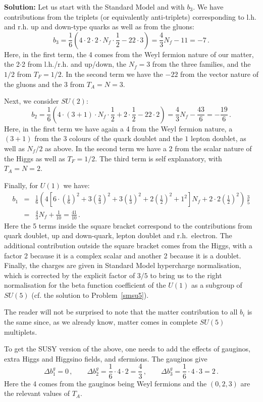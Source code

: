 \documentclass[12pt]{article}
\newcommand{\be}{\begin{equation}}
\newcommand{\ee}{\end{equation}}
\newcommand{\bea}{\begin{eqnarray}}
\newcommand{\eea}{\end{eqnarray}}
\numberwithin{equation}{section}
\begin{document}
\noindent
{\bf Solution:} Let us start with the Standard Model and with $b_3$. We have contributions from the triplets (or equivalently anti-triplets) corresponding to l.h. and r.h. up and down-type quarks as well as from the gluons:
\be
b_3=\frac{1}{6}\left(4\cdot 2\cdot 2 \cdot N_f\cdot\frac{1}{2}-22\cdot 3\right)=\frac{4}{3}N_f-11=-7\,.
\ee
Here, in the first term, the 4 comes from the Weyl fermion nature of our matter, the 2$\cdot$2 from l.h./r.h. and up/down, the $N_f=3$ from the three families, and the $1/2$ from $T_F=1/2$. In the second term we have the $-22$ from the vector nature of the gluons and the $3$ from $T_A=N=3$. 

Next, we consider $SU(2)$:
\be
b_2=\frac{1}{6}\left(4\cdot (3+1)\cdot N_f \cdot\frac{1}{2} + 2\cdot \frac{1}{2} - 22\cdot 2\right)=
\frac{4}{3}N_f-\frac{43}{6}=-\frac{19}{6}\,.
\ee
Here, in the first term we have again a 4 from the Weyl fermion nature, a $(3+1)$ from the 3 colours of the quark doublet and the $1$ lepton doublet, as well as $N_f/2$ as above. In the second term we have a 2 from the scalar nature of the Higgs as well as $T_F=1/2$. The third term is self explanatory, with $T_A=N=2$. 

Finally, for $U(1)$ we have:
\bea
b_1&=&\frac{1}{6}\left( 4\left[6\cdot\left(\frac{1}{6}\right)^2+ 3\left(\frac{2}{3}\right)^2+3\left(\frac{1}{3}\right)^2+ 2\left(\frac{1}{2}\right)^2+1^2 \right]N_f+2\cdot 2\left(\frac{1}{2}\right)^2\right)\,\frac{3}{5}
\nonumber
\\
&=&\frac{4}{3}N_f+\frac{1}{10}=\frac{41}{10}\,.
\eea
Here the 5 terms inside the square bracket correspond to the contributions from quark doublet, up and down-quark, lepton doublet and r.h.~electron. The additional contribution outside the square bracket comes from the Higgs, with a factor 2 because it is a complex scalar and another 2 because it is a doublet. Finally, the charges are given in Standard Model hypercharge normalisation, which is corrected by the explicit factor of $3/5$ to bring us to the right normalisation for the beta function coefficient of the $U(1)$ as a subgroup of $SU(5)$ (cf. the solution to Problem~\ref{smsu5}). 

The reader will not be surprised to note that the matter contribution to all $b_i$ is the same since, as we already know, matter comes in complete $SU(5)$ multiplets. 

To get the SUSY version of the above, one needs to add the effects of gauginos, extra Higgs and Higgsino fields, and sfermions. The gauginos give
\be
\Delta b_1^g=0\,,\qquad \Delta b_2^g=\frac{1}{6}\cdot 4\cdot 2 = \frac{4}{3}\,,\qquad \Delta b_3^g=\frac{1}{6}\cdot 4\cdot 3 = 2\,.
\ee
Here the 4 comes from the gauginos being Weyl fermions and the $(0,2,3)$ are the relevant values of $T_A$. 
\end{document}
